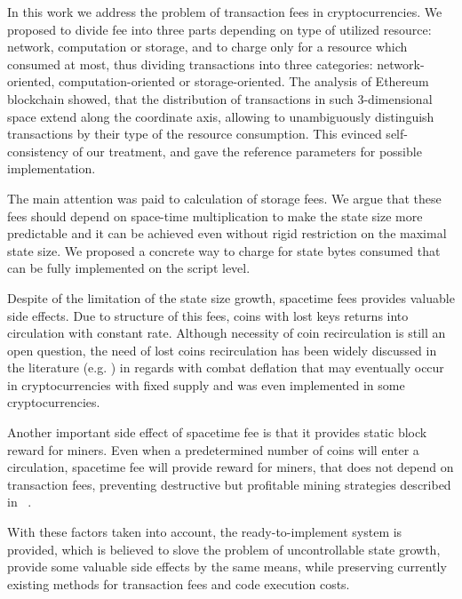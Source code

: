 \documentclass[]{llncs}   %
\begin{document}
In this work we address the problem of transaction fees in cryptocurrencies.
We proposed to divide fee into three parts depending on type of utilized resource:
network, computation or storage, and to charge only for a resource which
consumed at most, thus dividing transactions into three categories: network-oriented,
computation-oriented or storage-oriented. The analysis of Ethereum blockchain showed,
that the distribution of transactions in such 3-dimensional space extend along the
coordinate axis, allowing to unambiguously distinguish transactions by their
type of the resource consumption. This evinced self-consistency of our treatment,
and gave the reference parameters for possible implementation.


The main attention was paid to calculation of storage fees. We argue that
these fees should depend on space-time multiplication to make the state size
more predictable and it can be achieved even without rigid restriction on the
maximal state size. We proposed a concrete way to charge for state bytes consumed
that can be fully implemented on the script level.

Despite of the limitation of the state size growth, spacetime fees provides valuable side effects.
Due to structure of this fees, coins with lost keys returns into circulation with constant rate.
Although necessity of coin recirculation is still an open question, the need of lost coins recirculation
has been widely discussed in the literature (e.g. \cite{gjermundrod2014recirculating,gjermundrod2016going})
in regards with combat deflation that may eventually occur in cryptocurrencies with fixed supply and
was even implemented in some cryptocurrencies\cite{freicoin}.

Another important side effect of spacetime fee is that it provides static block reward
for miners. Even when a predetermined number of coins will enter a circulation,
spacetime fee will provide reward for miners, that does not depend on transaction
fees, preventing destructive but profitable mining strategies described in
~\cite{carlsten2016instability}.

With these factors taken into account, the ready-to-implement system is provided,
which is believed to slove the problem of uncontrollable state growth, provide some
valuable side effects by the same means, while preserving currently existing
methods for transaction fees and code execution costs.
\end{document}
